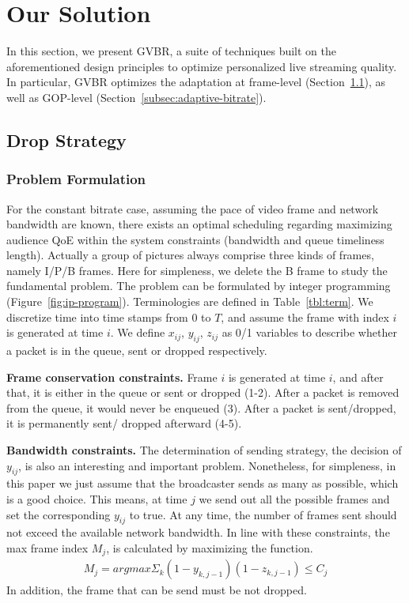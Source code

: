 \newcommand{\Mod}[1]{\text{ (mod } #1\text{)}}
\section{Our Solution}
In this section, we present GVBR, a suite of techniques built on the 
aforementioned design principles to optimize personalized live streaming 
quality. 
In particular, GVBR optimizes the adaptation at frame-level 
(Section~\ref{subsec:drop-strategy}), as well as GOP-level 
(Section~\ref{subsec:adaptive-bitrate}).

\subsection{Drop Strategy}
\label{subsec:drop-strategy}
\subsubsection{Problem Formulation}


For the constant bitrate case, assuming the pace of video frame and network bandwidth are known, there exists an optimal scheduling regarding maximizing audience QoE within the system constraints (bandwidth and queue timeliness length). Actually a group of pictures always comprise three kinds of frames, namely I/P/B frames. Here for simpleness, we delete the B frame to study the fundamental problem. The problem can be formulated by integer programming (Figure~\ref{fig:ip-program}). Terminologies are defined in Table~\ref{tbl:term}. We discretize time into time stamps from $0$ to $T$, and assume the frame with index $i$ is generated at time $i$. We define $x_{ij}$, $y_{ij}$, $z_{ij}$ as 0/1 variables to describe whether a packet is in the queue, sent or dropped respectively.

\textbf{Frame conservation constraints.}
Frame $i$ is generated at time $i$, and after that, it is either in the queue or sent or dropped (1-2).
After a packet is removed from the queue, it would never be enqueued (3).
After a packet is sent/dropped, it is permanently sent/ dropped afterward (4-5).

\textbf{Bandwidth constraints.}
The determination of sending strategy, the decision of $y_{ij}$, is also an interesting and important problem. Nonetheless, for simpleness, in this paper we just assume that the broadcaster sends as many as possible, which is a good choice. This means, at time $j$ we send out all the possible frames and set the corresponding $y_{ij}$ to true. At any time, the number of frames sent should not exceed the available network bandwidth. In line with these constraints, the max frame index $M_{j}$, is calculated by maximizing the function.
\begin{align}
M_j = argmax \Sigma_k (1-y_{k,j-1})(1-z_{k,j-1}) \leq C_{j}
\end{align}
In addition, the frame that can be send must be not dropped.

